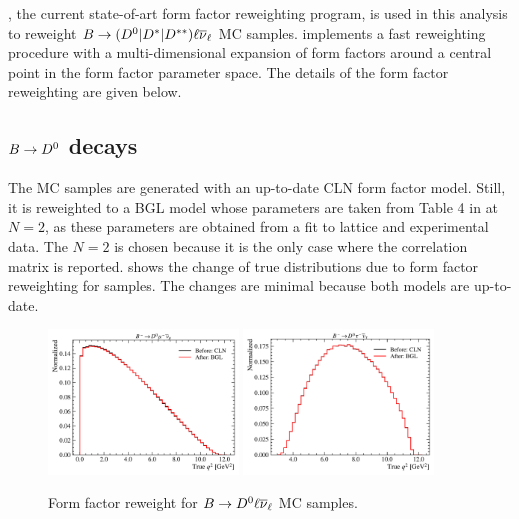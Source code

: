 \Hammer, the current state-of-art form factor reweighting program, is used
in this analysis to reweight
$B \rightarrow ({{D}^0}| {{D}^*}| D^{**}) {\ell}{{\overline{\nu}}_\ell}$ MC samples.
\Hammer implements a fast reweighting procedure with a multi-dimensional
expansion of form factors around a central point in the form factor parameter
space.
The details of the form factor reweighting are given below.

\subsection{$B \rightarrow {\ensuremath{{D}^0}}$ decays}

The \Dz MC samples are generated with an up-to-date CLN form factor model.
Still, it is reweighted to a BGL model whose parameters are taken
from Table 4 in \cite{Bigi_2016} at $N = 2$, as these
parameters are obtained from a fit to lattice and experimental data.
The $N = 2$ is chosen because it is the only case where the correlation matrix
is reported.
 shows the change of true \qSq distributions due to form factor
reweighting for \Dz samples.
The changes are minimal because both models are up-to-date.

\begin{figure}[htb]
    \centering
    \includegraphics[width=0.45\textwidth]{
        ./figs-mc-correction/reweighting-form-factors/norm/D0Mu.pdf
    }
    \includegraphics[width=0.45\textwidth]{
        ./figs-mc-correction/reweighting-form-factors/sig/D0Tau.pdf
    }
    \caption{
        Form factor reweight for $B \rightarrow {\ensuremath{{D}^0}} {\ensuremath{\ell}}{\ensuremath{{\overline{\nu}}_\ell}}$ MC samples.
    }
    \label{fig:ff-d0}
\end{figure}


